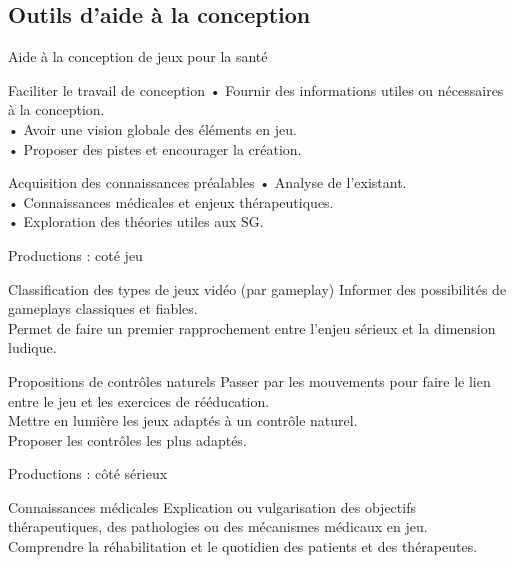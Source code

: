 \documentclass{beamer}
\begin{document}
		\subsection{Outils d'aide à la conception}
		\begin{frame}{Aide à la conception de jeux pour la santé}
			\begin{exampleblock}{Faciliter le travail de conception}
			• Fournir des informations utiles ou nécessaires à la conception.\\
			• Avoir une vision globale des éléments en jeu.\\
			• Proposer des pistes et encourager la création.
			\end{exampleblock}\pause
			
			\begin{block}{Acquisition des connaissances préalables}
				• Analyse de l'existant.\\
				• Connaissances médicales et enjeux thérapeutiques.\\
				• Exploration des théories utiles aux SG.				
			\end{block}
		\end{frame}
	
		\begin{frame}{Productions : coté jeu}
			\begin{block}{Classification des types de jeux vidéo (par gameplay)}
				Informer des possibilités de gameplays classiques et fiables.\\
				Permet de faire un premier rapprochement entre l'enjeu sérieux et la dimension ludique.
			\end{block}\pause
			\begin{block}{Propositions de contrôles naturels}
			Passer par les mouvements pour faire le lien entre le jeu et les exercices de rééducation.\\
			Mettre en lumière les jeux adaptés à un contrôle naturel.\\
			Proposer les contrôles les plus adaptés.
			\end{block}			
		\end{frame}
		
		\begin{frame}{Productions : côté sérieux}
			\begin{block}{Connaissances médicales}
			Explication ou vulgarisation des objectifs thérapeutiques, des pathologies ou des mécanismes médicaux en jeu.\\
			Comprendre la réhabilitation et le quotidien des patients et des thérapeutes.
			\end{block}
		\end{frame}	
		
\end{document}
